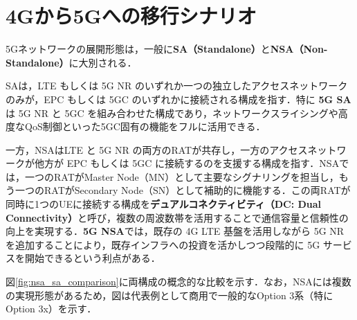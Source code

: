 \section{4Gから5Gへの移行シナリオ}
5Gネットワークの展開形態は，一般に\textbf{SA（Standalone）}と\textbf{NSA（Non-Standalone）}に大別される\cite{5G_NSA_SA_Primer}．

SAは，LTE もしくは 5G NR のいずれか一つの独立したアクセスネットワークのみが，EPC もしくは 5GC のいずれかに接続される構成を指す．特に \textbf{5G SA} は 5G NR と 5GC を組み合わせた構成であり，ネットワークスライシングや高度なQoS制御といった5GC固有の機能をフルに活用できる．

一方，NSAはLTE と 5G NR の両方のRATが共存し，一方のアクセスネットワークが他方が EPC もしくは 5GC に接続するのを支援する構成を指す．NSAでは，一つのRATがMaster Node（MN）として主要なシグナリングを担当し，もう一つのRATがSecondary Node（SN）として補助的に機能する．この両RATが同時に1つのUEに接続する構成を\textbf{デュアルコネクティビティ（DC: Dual Connectivity）}と呼び，複数の周波数帯を活用することで通信容量と信頼性の向上を実現する．\textbf{5G NSA}では，既存の 4G LTE 基盤を活用しながら 5G NR を追加することにより，既存インフラへの投資を活かしつつ段階的に 5G サービスを開始できるという利点がある．

図\ref{fig:nsa_sa_comparison}に両構成の概念的な比較を示す．なお，NSAには複数の実現形態があるため，図は代表例として商用で一般的なOption 3系（特にOption 3x）を示す．

